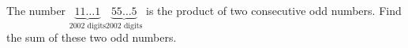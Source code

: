The number $\underbrace{11\ldots1}_{2002\text{ digits}}\underbrace{55\ldots5}_{2002\text{ digits}}$ is the product of two consecutive odd numbers. Find the sum of these two odd numbers.
